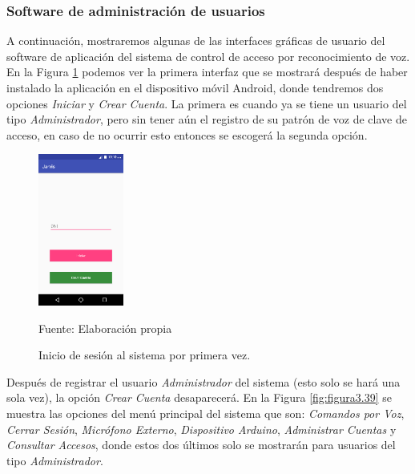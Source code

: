 \subsubsection{Software de administración de usuarios}
A continuación, mostraremos algunas de las interfaces gráficas de usuario del software de aplicación del sistema de control de acceso por reconocimiento de voz. En la Figura \ref{fig:figura3.35} podemos ver la primera interfaz que se mostrará después de haber instalado la aplicación en el dispositivo móvil Android, donde tendremos dos opciones \textit{Iniciar} y \textit{Crear Cuenta}. La primera es cuando ya se tiene un usuario del tipo \textit{Administrador}, pero sin tener aún el registro de su patrón de voz de clave de acceso, en caso de no ocurrir esto entonces se escogerá la segunda opción.
\begin{figure}[H]
\captionsetup{justification=centering}
\begin{center}
\includegraphics[width=0.25\textwidth]{Imagenes/Cap3/image035}
\end{center}
\begin{center}
\vskip -0.5cm
\caption{\small{Inicio de sesión al sistema por primera vez.}}
\label{fig:figura3.35}
{\small{Fuente: Elaboración propia}}
\end{center}
\end{figure}
\vskip -0.5cm
Después de registrar el usuario \textit{Administrador} del sistema (esto solo se hará una sola vez), la opción \textit{Crear Cuenta} desaparecerá.
\newpage
En la Figura \ref{fig:figura3.39} se muestra las opciones del menú principal del sistema que son: \textit{Comandos por Voz}, \textit{Cerrar Sesión}, \textit{Micrófono Externo}, \textit{Dispositivo Arduino}, \textit{Administrar Cuentas} y \textit{Consultar Accesos}, donde estos dos últimos solo se mostrarán para usuarios del tipo \textit{Administrador}.

